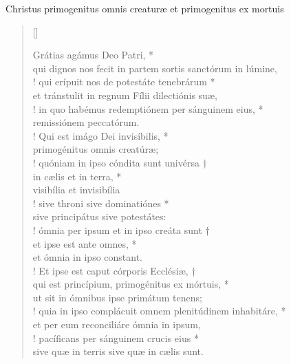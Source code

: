 


\def\greinitialformat#1{%
{\fontsize{39}{39}\selectfont #1}%
}




\vspace{0.3cm}
\begin{center}
 
Christus primogenitus omnis creaturæ et primogenitus ex mortuis\\
\end{center}
\begin{verse}[\versewidth]

Grátias agámus Deo Patri, *\\
qui dignos nos fecit
	in partem sortis sanctórum in lúmine,\\!
\vin qui erípuit nos de potestáte tenebrárum *\\
\vin et tránstulit in regnum Fílii dilectiónis suæ,\\!
in quo habémus redemptiónem per sánguinem eius, *\\
remissiónem peccatórum.\\!
\vin Qui est imágo Dei invisíbilis, *\\
\vin primogénitus omnis creatúræ;\\!
quóniam in ipso cóndita sunt univérsa †\\
in cælis et in terra, *\\
visibília et invisibília\\!
\vin sive throni sive dominatiónes *\\
\vin sive principátus sive potestátes:\\!
ómnia per ipsum et in ipso creáta sunt †\\
et ipse est ante omnes, *\\
et ómnia in ipso constant.\\!
\vin Et ipse est caput córporis Ecclésiæ, †\\
\vin qui est princípium, primogénitus ex mórtuis, *\\
\vin ut sit in ómnibus ipse primátum tenens;\\!
quia in ipso complácuit
	omnem plenitúdinem inhabitáre, *\\
et per eum reconciliáre ómnia in ipsum,\\!
\vin pacíficans per sánguinem crucis eius *\\
\vin sive quæ in terris sive quæ in cælis sunt.\\
\end{verse}
\vspace{1cm}


